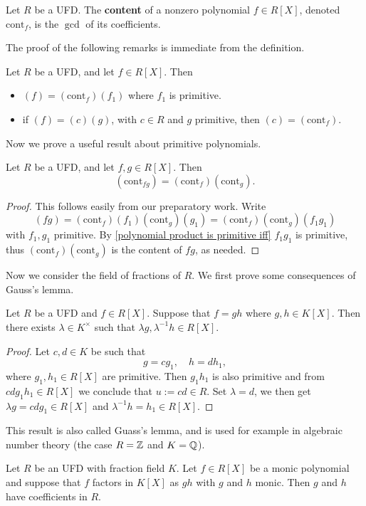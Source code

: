 \begin{definition}
Let $R$ be a UFD. The \textbf{content} of a nonzero polynomial $f\in R[X]$, denoted $\mathrm{cont}_f$, is the $\gcd$ of its coefficients.
\end{definition}
The proof of the following remarks is immediate from the definition.
\begin{lemma}
Let $R$ be a UFD, and let $f\in R[X]$. Then
\begin{itemize}
\item $(f)=(\mathrm{cont}_f)(f_1)$ where $f_1$ is primitive.
\item if $(f)=(c)(g)$, with $c\in R$ and $g$ primitive, then $(c)=(\mathrm{cont}_f)$.
\end{itemize}
\end{lemma}
Now we prove a useful result about primitive polynomials.
\begin{proposition}
Let $R$ be a UFD, and let $f,g\in R[X]$. Then
\[(\mathrm{cont}_{fg})=(\mathrm{cont}_f)(\mathrm{cont}_g).\]
\end{proposition}
\begin{proof}
This follows easily from our preparatory work. Write
\[(fg)=(\mathrm{cont}_f)(f_1)(\mathrm{cont}_g)(g_1)=(\mathrm{cont}_f)(\mathrm{cont}_g)(f_1g_1)\]
with $f_1,g_1$ primitive. By \cref{polynomial product is primitive iff} $f_1g_1$ is primitive, thus $(\mathrm{cont}_f)(\mathrm{cont}_g)$ is the content of $fg$, as needed.
\end{proof}
Now we consider the field of fractions of $R$. We first prove some consequences of Gauss's lemma.
\begin{proposition}\label{UFD factorization in field of fraction}
Let $R$ be a UFD and $f\in R[X]$. Suppose that $f=gh$ where $g,h\in K[X]$. Then there exists $\lambda\in K^\times$ such that $\lambda g,\lambda^{-1}h\in R[X]$.
\end{proposition}
\begin{proof}
Let $c,d\in K$ be such that
\[g=cg_1,\quad h=dh_1,\]
where $g_1,h_1\in R[X]$ are primitive. Then $g_1h_1$ is also primitive and from $cdg_1h_1\in R[X]$ we conclude that $u:=cd\in R$. Set $\lambda=d$, we then get $\lambda g=cdg_1\in R[X]$ and $\lambda^{-1}h=h_1\in R[X]$.
\end{proof}
This result is also called Guass's lemma, and is used for example in algebraic number theory (the case $R=\mathbb{Z}$ and $K=\mathbb{Q}$).
\begin{corollary}\label{UFD monic polynomial factorization in field of fraction}
Let $R$ be an UFD with fraction field $K$. Let $f\in R[X]$ be a monic polynomial and suppose that $f$ factors in $K[X]$ as $gh$ with $g$ and $h$ monic. Then $g$ and $h$ have coefficients in $R$.
\end{corollary}
